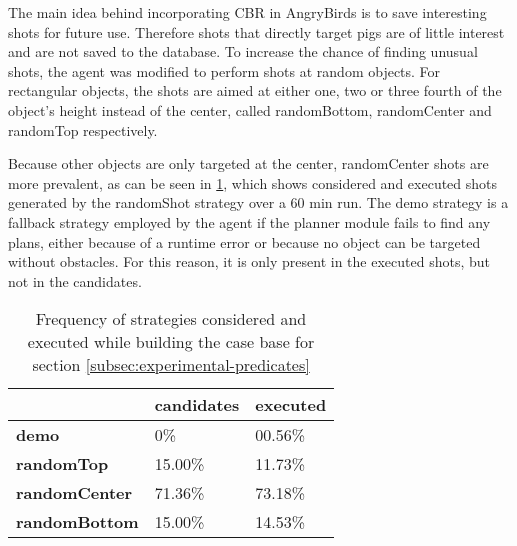 The main idea behind incorporating CBR in AngryBirds is to save interesting shots for future use. Therefore shots that directly target pigs are of little interest and are not saved to the database.
To increase the chance of finding unusual shots, the agent was modified to perform shots at random objects. For rectangular objects, the shots are aimed at either one, two or three fourth of the object's height instead of the center, called randomBottom, randomCenter and randomTop respectively.

Because other objects are only targeted at the center, randomCenter shots are more prevalent, as can be seen in \ref{tab:strat-distribution}, which shows considered and executed shots generated by the randomShot strategy over a 60 min run.
The demo strategy is a fallback strategy employed by the agent if the planner module fails to find any plans, either because of a runtime error or because no object can be targeted without obstacles. For this reason, it is only present in the executed shots, but not in the candidates.


\begin{table}[b]
    \centering
    \begin{tabular}{l|l|l}
                              & \textbf{candidates} & \textbf{executed} \\ \hline
        \textbf{demo}         & 0\%                 & 00.56\%           \\ \hline
        \textbf{randomTop}    & 15.00\%             & 11.73\%           \\ \hline
        \textbf{randomCenter} & 71.36\%             & 73.18\%           \\ \hline
        \textbf{randomBottom} & 15.00\%             & 14.53\%
    \end{tabular}
    \caption{Frequency of strategies considered and executed while building the case base for section \ref{subsec:experimental-predicates}}
    \label{tab:strat-distribution}
\end{table}